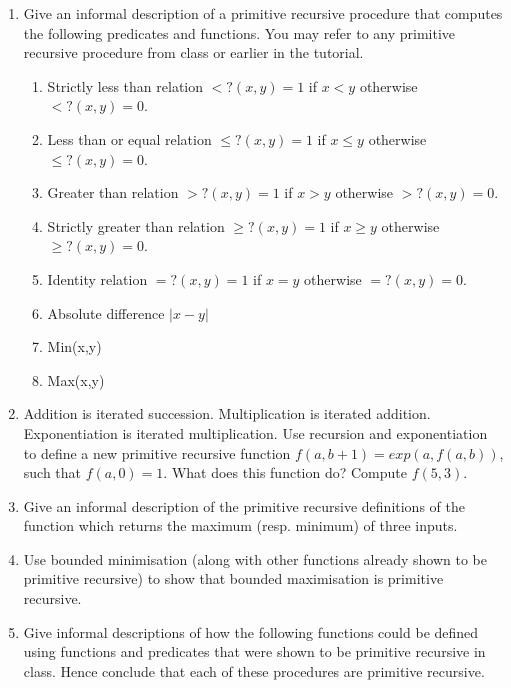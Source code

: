 \documentclass[11pt]{report}
\begin{document}
\begin{enumerate}
		\item Give an informal description of a primitive recursive procedure that computes the following predicates and functions. You may refer to any primitive recursive procedure from class or earlier in the tutorial. 
	
		\begin{enumerate}

			\item Strictly less than relation $<?(x,y) = 1$ if $x<y$ otherwise $<?(x,y) = 0$.
			
			\item Less than or equal relation $\leq ?(x,y) = 1$ if $x\leq y$ otherwise $\leq ?(x,y) = 0$.
			
			\item Greater than relation $>?(x,y) = 1$ if $x>y$ otherwise $>?(x,y) = 0$.
			
			\item Strictly greater than relation $\geq ?(x,y) = 1$ if $x\geq y$ otherwise $\geq ?(x,y) = 0$.
			
			\item Identity relation $=?(x,y) = 1$ if $x=y$ otherwise $=?(x,y) = 0$. 
			
			\item Absolute difference $|x-y|$
			
			\item Min(x,y)
			
			\item Max(x,y)
		
		\end{enumerate}
	
	\item Addition is iterated succession. Multiplication is iterated addition. Exponentiation is iterated multiplication. Use recursion and exponentiation to define a new primitive recursive function $f(a,b+1) = exp(a,f(a,b))$, such that $f(a,0) = 1$. What does this function do? Compute $f(5,3)$.
	
	\item Give an informal description of the primitive recursive definitions of the function which returns the maximum (resp. minimum) of three inputs. 

	\item Use bounded minimisation (along with other functions already shown to be primitive recursive) to show that bounded maximisation is primitive recursive.  

	\item Give informal descriptions of how the following functions could be defined using functions and predicates that were shown to be primitive recursive in class. Hence conclude that each of these procedures are primitive recursive. 
	

\end{enumerate}
\end{document}
